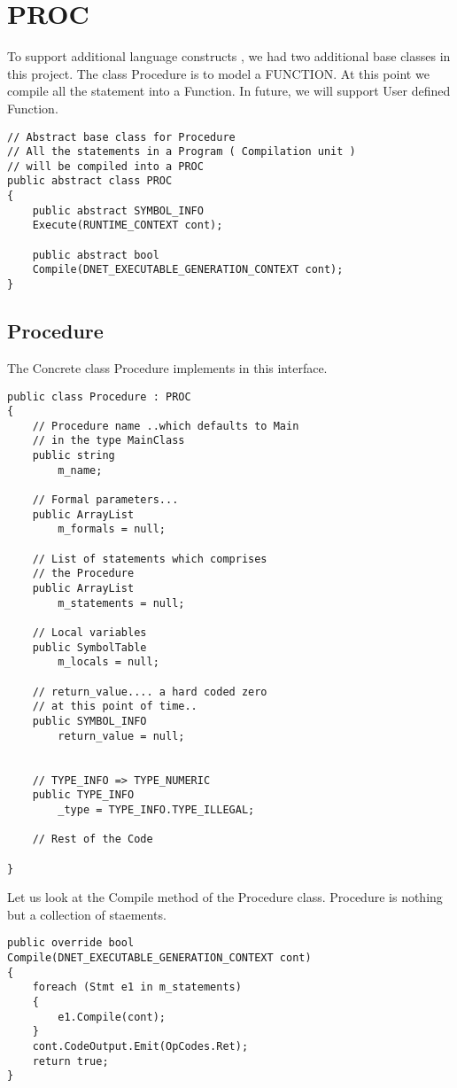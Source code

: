 \section{PROC}
To support additional language constructs , we had two additional base classes in this project. The class Procedure is to model a FUNCTION. At this point we compile all the statement into a Function. In future, we will support User defined Function.
\lstset{style=csharp}
\begin{lstlisting}
// Abstract base class for Procedure
// All the statements in a Program ( Compilation unit )
// will be compiled into a PROC
public abstract class PROC
{
	public abstract SYMBOL_INFO 
	Execute(RUNTIME_CONTEXT cont);
	
	public abstract bool 
	Compile(DNET_EXECUTABLE_GENERATION_CONTEXT cont);
}
\end{lstlisting}
\subsection{Procedure}
The Concrete class Procedure implements in this interface.
\lstset{style=csharp}
\begin{lstlisting}
public class Procedure : PROC
{
	// Procedure name ..which defaults to Main
	// in the type MainClass
	public string 
		m_name;
	
	// Formal parameters...	
	public ArrayList 
		m_formals = null;
		
	// List of statements which comprises 
	// the Procedure
	public ArrayList 
		m_statements = null;

	// Local variables
	public SymbolTable 
		m_locals = null;

	// return_value.... a hard coded zero 
	// at this point of time..
	public SYMBOL_INFO 
		return_value = null;
	

	// TYPE_INFO => TYPE_NUMERIC
	public TYPE_INFO 
		_type = TYPE_INFO.TYPE_ILLEGAL;
	
	// Rest of the Code
	
}
\end{lstlisting}
Let us look at the Compile method of the Procedure class. Procedure is nothing but a collection of staements.

\lstset{style=csharp}
\begin{lstlisting}
public override bool 
Compile(DNET_EXECUTABLE_GENERATION_CONTEXT cont)
{
	foreach (Stmt e1 in m_statements)
	{
		e1.Compile(cont);
	}
	cont.CodeOutput.Emit(OpCodes.Ret);
	return true;
}
\end{lstlisting}

